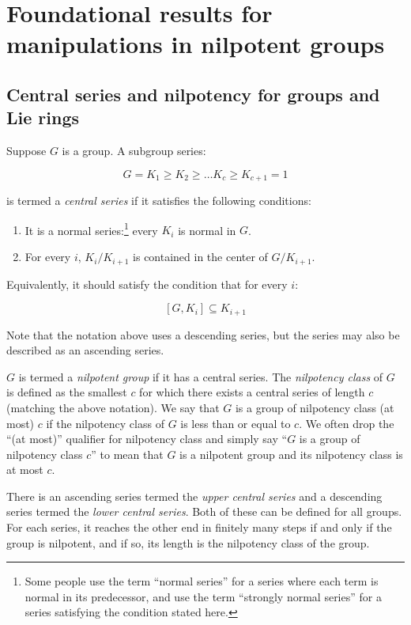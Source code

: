 
\section{Foundational results for manipulations in nilpotent groups}

\subsection{Central series and nilpotency for groups and Lie rings}\label{appsec:group-basic}

Suppose $G$ is a group. A subgroup series:

$$G = K_1 \ge K_2 \ge \dots K_c \ge K_{c+1} = 1$$

is termed a {\em central series} if it satisfies the following conditions:

\begin{enumerate}
\item It is a normal series:\footnote{Some people use the term
  ``normal series'' for a series where each term is normal in its
  predecessor, and use the term ``strongly normal series'' for a
  series satisfying the condition stated here.} every $K_i$ is normal
  in $G$.
\item For every $i$, $K_i/K_{i+1}$ is contained in the center of $G/K_{i+1}$.
\end{enumerate}

Equivalently, it should satisfy the condition that for every $i$:

$$[G,K_i] \subseteq K_{i+1}$$

Note that the notation above uses a descending series, but the series
may also be described as an ascending series.

$G$ is termed a {\em nilpotent group} if it has a central series. The
{\em nilpotency class} of $G$ is defined as the smallest $c$ for which
there exists a central series of length $c$ (matching the above
notation). We say that $G$ is a group of nilpotency class (at most)
$c$ if the nilpotency class of $G$ is less than or equal to $c$. We
often drop the ``(at most)'' qualifier for nilpotency class and simply
say ``$G$ is a group of nilpotency class $c$'' to mean that $G$ is a
nilpotent group and its nilpotency class is at most $c$.

There is an ascending series termed the {\em upper central series} and
a descending series termed the {\em lower central series}. Both
of these can be defined for all groups. For each series, it reaches
the other end in finitely many steps if and only if the group is
nilpotent, and if so, its length is the nilpotency class of the group.

